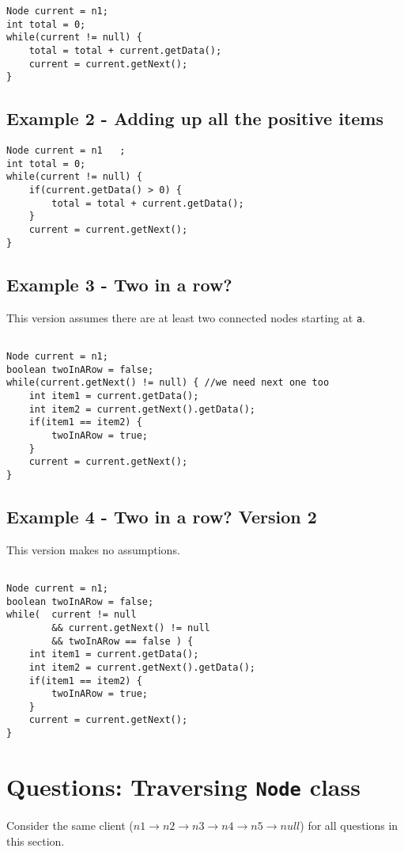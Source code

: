 \begin{lstlisting}
Node current = n1;
int total = 0;
while(current != null) {
	total = total + current.getData();
	current = current.getNext();
}
\end{lstlisting}

\subsection*{Example 2 - Adding up all the positive items}

\begin{lstlisting}
Node current = n1	;
int total = 0;
while(current != null) {
	if(current.getData() > 0) {
		total = total + current.getData();
	}
	current = current.getNext();
}
\end{lstlisting}

\subsection*{Example 3 - Two in a row?}

This version assumes there are at least two connected nodes starting at \texttt{a}.
\begin{lstlisting}

Node current = n1;
boolean twoInARow = false;
while(current.getNext() != null) { //we need next one too
	int item1 = current.getData();
	int item2 = current.getNext().getData();
	if(item1 == item2) {
		twoInARow = true;
	}
	current = current.getNext();
}
\end{lstlisting}

\subsection*{Example 4 - Two in a row? Version 2}

This version makes no assumptions.
\begin{lstlisting}

Node current = n1;
boolean twoInARow = false;
while( 	current != null 
		&& current.getNext() != null
		&& twoInARow == false ) {
	int item1 = current.getData();
	int item2 = current.getNext().getData();
	if(item1 == item2) {
		twoInARow = true;
	}
	current = current.getNext();
}
\end{lstlisting}

\section*{Questions: Traversing \texttt{Node} class}
Consider the same client ($n1 \rightarrow n2 \rightarrow n3 \rightarrow n4 \rightarrow n5 \rightarrow null$) for all questions in this section.

